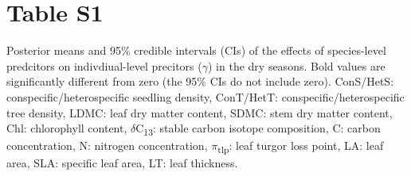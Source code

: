 \documentclass[
  12pt,
  letterpaper,
  DIV=11,
  numbers=noendperiod]{scrartcl}
\author{}
\date{}
\begin{document}
\ifdefined\Shaded\renewenvironment{Shaded}{\begin{tcolorbox}[breakable, interior hidden, borderline west={3pt}{0pt}{shadecolor}, sharp corners, frame hidden, enhanced, boxrule=0pt]}{\end{tcolorbox}}\fi

\hypertarget{table-s1}{%
\section{Table S1}\label{table-s1}}

Posterior means and 95\% credible intervals (CIs) of the effects of
species-level predcitors on indivdiual-level precitors (\(\gamma\)) in
the dry seasons. Bold values are significantly different from zero (the
95\% CIs do not include zero). ConS/HetS: conspecific/heterospecific
seedling density, ConT/HetT: conspecific/heterospecific tree density,
LDMC: leaf dry matter content, SDMC: stem dry matter content, Chl:
chlorophyll content, \(\delta\)C\textsubscript{13}: stable carbon
isotope composition, C: carbon concentration, N: nitrogen concentration,
\(\pi\)\textsubscript{tlp}: leaf turgor loss point, LA: leaf area, SLA:
specific leaf area, LT: leaf thickness.
\end{document}
